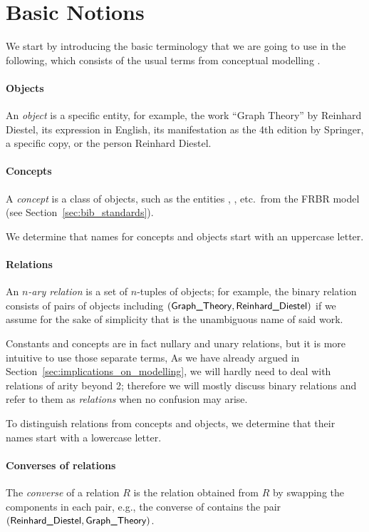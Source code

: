 \section{Basic Notions}
\label{sec:terminology}

We start by introducing the basic terminology that we are going to use
in the following, which consists of the usual terms from conceptual
modelling \autocite{Brodie1984}.

\paragraph{Objects}
An \emph{object} is a specific entity,
for example, the work \enquote{Graph Theory} by Reinhard Diestel,
its expression in English,
its manifestation as the 4th edition by Springer,
a specific copy, or the person Reinhard Diestel.

\paragraph{Concepts}
A \emph{concept} is a class of objects,
such as the entities , , etc.\
from the \gls{FRBR} model (see Section~\ref{sec:bib_standards}).

We determine that names for concepts and objects start with an uppercase letter.

\paragraph{Relations}
An \emph{$n$-ary relation} is a set of $n$-tuples of objects;
for example, the binary relation 
consists of pairs of objects including $(,\term{Reinhard\_Diestel})$
if we assume for the sake of simplicity that \term{Graph\_Theory}
is the unambiguous name of said work. 

Constants and concepts are in fact nullary and unary relations,
but it is more intuitive to use those separate terms,
As we have already argued in Section~\ref{sec:implications_on_modelling},
we will hardly need to deal with relations of arity beyond 2;
therefore we will mostly discuss binary relations
and refer to them as \emph{relations} when no confusion may arise.

To distinguish relations from concepts and objects,
we determine that their names start with a lowercase letter.

\paragraph{Converses of relations}
The \emph{converse} of a relation $R$ is the relation obtained from $R$
by swapping the components in each pair,
e.g., the converse  of 
contains the pair $(\textsf{Reinhard\_Diestel},\textsf{Graph\_Theory})$.

